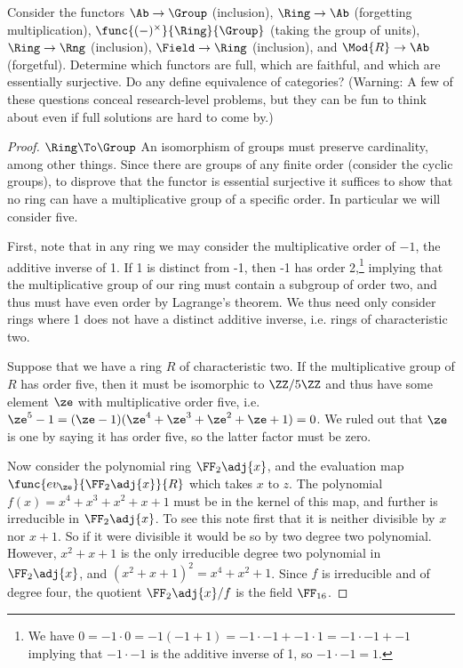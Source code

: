 \documentclass[main.tex]{subfiles}
\begin{document}
\begin{exercise}
	Consider the functors \(\Ab\to\Group\) (inclusion), \(\Ring\to\Ab\)
	(forgetting multiplication), \(\func{(-)^\times}{\Ring}{\Group}\) (taking
	the group of units), \(\Ring\to\Rng\) (inclusion), \(\Field\to\Ring\)
	(inclusion), and \(\Mod{R}\to\Ab\) (forgetful). Determine which functors are
	full, which are faithful, and which are essentially surjective. Do any
	define equivalence of categories? (Warning: A few of these questions conceal
	research-level problems, but they can be fun to think about even if full
	solutions are hard to come by.)
\end{exercise}
\begin{proof} {\(\Ring\To\Group\)}
	An isomorphism of groups must preserve cardinality, among other things.
	Since there are groups of any finite order (consider the cyclic groups), to
	disprove that the functor is essential surjective it suffices to show that
	no ring can have a multiplicative group of a specific order. In particular
	we will consider five.

	First, note that in any ring we may consider the multiplicative order of
	\(-1\), the additive inverse of 1. If 1 is distinct from -1, then -1 has
	order 2,\footnote{We have
		\(0=-1\cdot 0=-1(-1+1)=-1\cdot-1+-1\cdot1=-1\cdot-1+-1\) implying that
	\(-1\cdot-1\) is the additive inverse of 1, so \(-1\cdot-1=1\).} implying
	that the multiplicative group of our ring must contain a subgroup of order
	two, and thus must have even order by Lagrange's theorem. We thus need only
	consider rings where 1 does not have a distinct additive inverse, i.e.
	rings of characteristic two.

	Suppose that we have a ring \(R\) of characteristic two. If the
	multiplicative group of \(R\) has order five, then it must be isomorphic to
	\(\ZZ/5\ZZ\) and thus have some element \(\ze\) with multiplicative order
	five, i.e. \(\ze^5-1=(\ze-1)(\ze^4+\ze^3+\ze^2+\ze+1)=0\). We ruled out that
	\(\ze\) is one by saying it has order five, so the latter factor must be
	zero. %

	Now consider the polynomial ring \(\FF_2\adj{x}\), and the evaluation map
	\(\func{ev_\ze}{\FF_2\adj{x}}{R}\) which takes \(x\) to \(z\). The
	polynomial \(f(x)=x^4+x^3+x^2+x+1\) must be in the kernel of this map, and
	further is irreducible in \(\FF_2\adj{x}\). To see this note first that it
	is neither divisible by \(x\) nor \(x+1\). So if it were divisible it would
	be so by two degree two polynomial. However, \(x^2+x+1\) is the only
	irreducible degree two polynomial in \(\FF_2\adj{x}\), and
	\((x^2+x+1)^2=x^4+x^2+1\). Since \(f\) is irreducible and of degree four,
	the quotient \(\FF_2\adj{x}/f\) is the field \(\FF_{16}\).
	

\end{proof}
\end{document}
